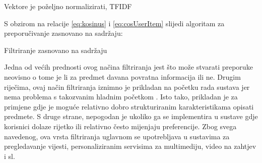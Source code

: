 \documentclass[times, utf8, diplomski, numeric]{fer}
\begin{document}

Vektore je poželjno normalizirati, TFIDF

S obzirom na relacije \ref{eq:kosinus} i \ref{eq:cosUserItem} slijedi algoritam
za preporučivanje zasnovano na sadržaju:

\begin{algorithm}[!htbp]
	\caption{Filtriranje zasnovano na sadržaju}
	\label{algo:content}
	\begin{algorithmic}[1]
		
				\ENDIF
			\ENDFOR
			\ENDFOR
		\ENDFOR
		
				\ENDIF
			\ENDFOR
		\ENDFOR
		

			\ENDFOR
		\ENDFOR
		
	\end{algorithmic}
\end{algorithm}

Jedna od većih prednosti ovog načina filtriranja jest što može stvarati
preporuke neovisno o tome je li za predmet davana povratna informacija ili ne.
Drugim riječima, ovaj način filtriranja iznimno je prikladan na početku rada
sustava jer nema problema s takozvanim hladnim početkom .
Isto tako, prikladan je za primjene gdje je moguće relativno dobro strukturiranim
karakteristikama opisati predmete. S druge strane, nepogodan je ukoliko ga
se implementira u sustave gdje korisnici dolaze rijetko ili relativno često
mijenjaju preferencije. Zbog svega navedenog, ova vrsta filtriranja uglavnom se
upotrebljava u sustavima za pregledavanje vijesti, personaliziranim servisima za
multimediju, video na zahtjev i sl.
\end{document}
